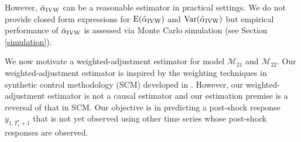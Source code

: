 \documentclass[11pt,3p,review,authoryear]{elsarticle}
\def\mc#1{\mathcal{#1}} %
\def\E#1{\mathrm{E}(#1)} %
\def\var#1{\mathrm{Var}(#1)} %
\theoremstyle{definition}
\begin{document}
However, $\hat{\alpha}_{\rm IVW}$ can be a reasonable estimator in 
practical settings.
We do not provide closed form expressions for $\E{\hat{\alpha}_{\rm IVW}}$ 
and $\var{\hat{\alpha}_{\rm IVW}}$ but empirical performance of 
$\hat{\alpha}_{\rm IVW}$ is assessed via Monte Carlo simulation 
(see Section \ref{simulation}).


We now motivate a weighted-adjustment estimator for model $\mc{M}_{21}$ 
and $\mc{M}_{22}$. Our weighted-adjustment estimator is inspired by the 
weighting techniques in synthetic control methodology (SCM) developed 
in \cite{abadie2010synthetic}. 
However, our weighted-adjustment estimator is not a causal estimator and 
our estimation premise is a reversal of that in SCM. 
Our objective is in predicting a post-shock response $y_{1,T_1^*+1}$ that is not yet 
observed using other time series whose post-shock responses are observed.
\end{document}
